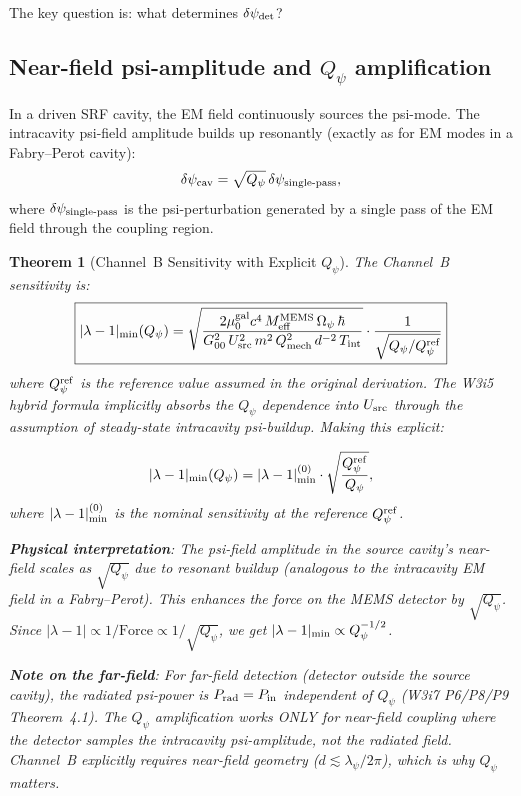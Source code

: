 \documentclass[11pt]{article}
\newcommand{\dpsi}{\delta\psi}
\newcommand{\lam}{\lambda}
\newcommand{\Opsi}{\Omega_\psi}
\newcommand{\Meff}{M_{\rm eff}}
\newcommand{\Qpsi}{Q_\psi}
\newcommand{\Qmech}{Q_{\rm mech}}
\newcommand{\muG}{\mu_0^{\rm gal}}
\newcommand{\lbone}{|\lam - 1|}
\newtheorem{theorem}{Theorem}[section]
\theoremstyle{definition}
\theoremstyle{remark}
\begin{document}
The key question is: what determines $\dpsi_{\rm det}$?

\subsection{Near-field psi-amplitude and $\Qpsi$ amplification}

In a driven SRF cavity, the EM field continuously sources the psi-mode.
The intracavity psi-field amplitude builds up resonantly (exactly as for
EM modes in a Fabry--Perot cavity):
\begin{equation}
\dpsi_{\rm cav} = \sqrt{\Qpsi}\,\dpsi_{\rm single\text{-}pass},
\label{eq:Qpsi_amplification}
\end{equation}
where $\dpsi_{\rm single\text{-}pass}$ is the psi-perturbation generated
by a single pass of the EM field through the coupling region.

\begin{theorem}[Channel~B Sensitivity with Explicit $\Qpsi$]
\label{thm:channelB_Qpsi}
The Channel~B sensitivity is:
\begin{equation}
\boxed{
\lbone_{\rm min}(\Qpsi) = \sqrt{
\frac{2\muG c^4\,\Meff^{\rm MEMS}\,\Opsi\,\hbar}
{G_{00}^2\,U_{\rm src}^2\,m^2\,\Qmech^2\,d^{-2}\,T_{\rm int}}
}\cdot\frac{1}{\sqrt{\Qpsi/\Qpsi^{\rm ref}}}
}
\label{eq:channelB_Qpsi}
\end{equation}
where $\Qpsi^{\rm ref}$ is the reference value assumed in the original
derivation. The W3i5 hybrid formula implicitly absorbs the $\Qpsi$
dependence into $U_{\rm src}$ through the assumption of steady-state
intracavity psi-buildup. Making this explicit:

\begin{equation}
\lbone_{\rm min}(\Qpsi)
= \lbone_{\rm min}^{(0)}\cdot\sqrt{\frac{\Qpsi^{\rm ref}}{\Qpsi}},
\label{eq:channelB_scaling}
\end{equation}
where $\lbone_{\rm min}^{(0)}$ is the nominal sensitivity at the
reference $\Qpsi^{\rm ref}$.

\textbf{Physical interpretation}: The psi-field amplitude in the source
cavity's near-field scales as $\sqrt{\Qpsi}$ due to resonant buildup
(analogous to the intracavity EM field in a Fabry--Perot). This
enhances the force on the MEMS detector by $\sqrt{\Qpsi}$. Since
$\lbone \propto 1/\text{Force} \propto 1/\sqrt{\Qpsi}$, we get
$\lbone_{\rm min} \propto \Qpsi^{-1/2}$.

\textbf{Note on the far-field}: For far-field detection (detector
outside the source cavity), the radiated psi-power is $P_{\rm rad} =
P_{\rm in}$ independent of $\Qpsi$ (W3i7 P6/P8/P9 Theorem~4.1). The
$\Qpsi$ amplification works ONLY for near-field coupling where the
detector samples the intracavity psi-amplitude, not the radiated field.
Channel~B explicitly requires near-field geometry ($d \lesssim
\lambda_\psi/2\pi$), which is why $\Qpsi$ matters.

\end{theorem}
\end{document}

